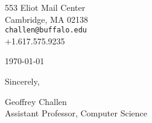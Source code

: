 

\def\shorttitle{Short Title}
\def\shortauthors{Geoffrey Challen}


\pagestyle{letter}

553 Eliot Mail Center\\
Cambridge, MA 02138\\
\texttt{challen@buffalo.edu}\\
+1.617.575.9235

\vspace*{0.1in}

\today

\vspace*{0.1in}



\vspace*{0.1in}

Sincerely,

\vspace*{0.5in}

Geoffrey Challen\\
Assistant Professor, Computer Science


